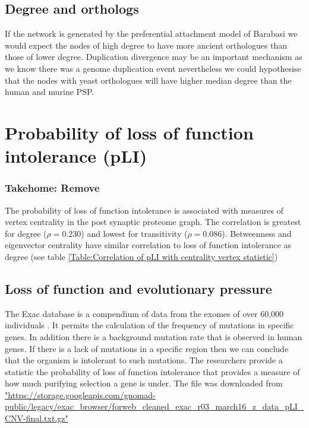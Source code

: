 



\subsection{Degree and orthologs}

If the network is generated by the preferential attachment model of Barabasi we would expect the nodes of high degree to have more ancient orthologues than those of lower degree.  Duplication divergence  may be an important mechanism as we know there was a genome duplication event nevertheless we could hypothesise that the nodes with yeast orthologues will have higher median degree than the human and murine PSP. 

\section{Probability of loss of function intolerance (pLI)}

 \subsubsection{Takehome: Remove}

The probability of loss of function intolerance is associated with measures of vertex centrality in the post synaptic proteome graph. The correlation is greatest for degree ($\rho=0.230$) and lowest for transitivity ($\rho=0.086$). Betweenness and eigenvector centrality have similar correlation to loss of function intolerance as degree (see table \ref{Table:Correlation of pLI with centrality vertex statistic})

\subsection{Loss of function and evolutionary pressure}

The Exac database is a compendium of data from the exomes of over 60,000 individuals \cite{lek2016analysis}. It permits the calculation of the frequency of mutations in specific genes. In addition there is a background mutation rate that is observed in human genes. If there is a lack of mutations in a specific region then we can conclude that the organism is intolerant to such mutations. The researchers provide a statistic the probability of loss of function intolerance that provides a measure of how much purifying selection a gene is under. The file was downloaded from 
\url{"https://storage.googleapis.com/gnomad-public/legacy/exac_browser/forweb_cleaned_exac_r03_march16_z_data_pLI_CNV-final.txt.gz"}

